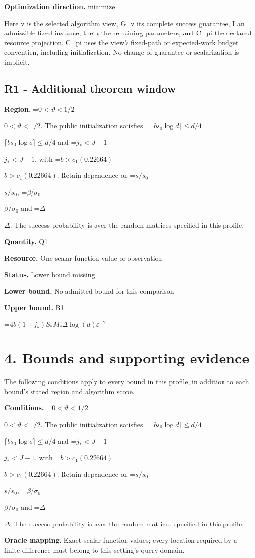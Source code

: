 \documentclass[10pt,a4paper]{article}
\newcommand{\AtlasMath}[1]{\par\begingroup\centering\setbox0=\hbox{$\displaystyle #1$}\ifdim\wd0>1.4\linewidth\typeout{ATLAS WIDE FORMULA: \the\wd0}\fi\ifdim\wd0>\linewidth\resizebox{\linewidth}{!}{\box0}\else\box0\fi\par\endgroup}
\newcommand{\AtlasInlineMath}[1]{\begingroup\setbox0=\hbox{$#1$}\ifdim\wd0>.4\linewidth\endgroup\AtlasMath{#1}\else\endgroup$#1$\fi}
\begin{document}
\textbf{Optimization direction.} minimize

Here v is the selected algorithm view, G\_v its complete success guarantee, I an admissible fixed instance, theta the remaining parameters, and C\_pi the declared resource projection. C\_pi uses the view's fixed-path or expected-work budget convention, including initialization. No change of guarantee or scalarization is implicit.

\subsection{R1 - Additional theorem window}
\textbf{Region.} \AtlasInlineMath{0<\vartheta<1/2}. The public initialization satisfies \AtlasInlineMath{\lceil bs_0\log d\rceil\le d/4} and \AtlasInlineMath{j_*<J-1}, with \AtlasInlineMath{b>c_1(0.22664)}. Retain dependence on \AtlasInlineMath{s/s_0}, \AtlasInlineMath{\beta/\sigma_0} and \AtlasInlineMath{\Delta}. The success probability is over the random matrices specified in this profile.

\textbf{Quantity.} Q1

\textbf{Resource.} One scalar function value or observation

\textbf{Status.} Lower bound missing

\textbf{Lower bound.} No admitted bound for this comparison

\textbf{Upper bound.} B1

\AtlasMath{4b(1+j_*)S_*M_*\Delta\log(d)\varepsilon^{-2}}
\section{4. Bounds and supporting evidence}
The following conditions apply to every bound in this profile, in addition to each bound's stated region and algorithm scope.

\textbf{Conditions.} \AtlasInlineMath{0<\vartheta<1/2}. The public initialization satisfies \AtlasInlineMath{\lceil bs_0\log d\rceil\le d/4} and \AtlasInlineMath{j_*<J-1}, with \AtlasInlineMath{b>c_1(0.22664)}. Retain dependence on \AtlasInlineMath{s/s_0}, \AtlasInlineMath{\beta/\sigma_0} and \AtlasInlineMath{\Delta}. The success probability is over the random matrices specified in this profile.

\textbf{Oracle mapping.} Exact scalar function values; every location required by a finite difference must belong to this setting's query domain.
\end{document}
